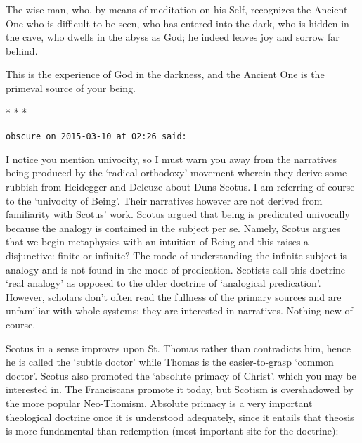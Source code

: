 \begin{quotex}
The wise man, who, by means of meditation on his Self, recognizes the Ancient One who is difficult to be seen, who has entered into the dark, who is hidden in the cave, who dwells in the abyss as God; he indeed leaves joy and sorrow far behind. 

\end{quotex}
This is the experience of God in the darkness, and the Ancient One is the primeval source of your being.


\begin{center}* * *\end{center}

\begin{footnotesize}\begin{sffamily}



\texttt{obscure on 2015-03-10 at 02:26 said: }

I notice you mention univocity, so I must warn you away from the narratives being produced by the `radical orthodoxy' movement wherein they derive some rubbish from Heidegger and Deleuze about Duns Scotus. I am referring of course to the `univocity of Being'. Their narratives however are not derived from familiarity with Scotus' work. Scotus argued that being is predicated univocally because the analogy is contained in the subject per se. Namely, Scotus argues that we begin metaphysics with an intuition of Being and this raises a disjunctive: finite or infinite? The mode of understanding the infinite subject is analogy and is not found in the mode of predication. Scotists call this doctrine `real analogy' as opposed to the older doctrine of `analogical predication'. However, scholars don't often read the fullness of the primary sources and are unfamiliar with whole systems; they are interested in narratives. Nothing new of course.

Scotus in a sense improves upon St. Thomas rather than contradicts him, hence he is called the `subtle doctor' while Thomas is the easier-to-grasp `common doctor'. Scotus also promoted the `absolute primacy of Christ'. which you may be interested in. The Franciscans promote it today, but Scotism is overshadowed by the more popular Neo-Thomism. Absolute primacy is a very important theological doctrine once it is understood adequately, since it entails that theosis is more fundamental than redemption (most important site for the doctrine):


\end{sffamily}
\end{footnotesize}
